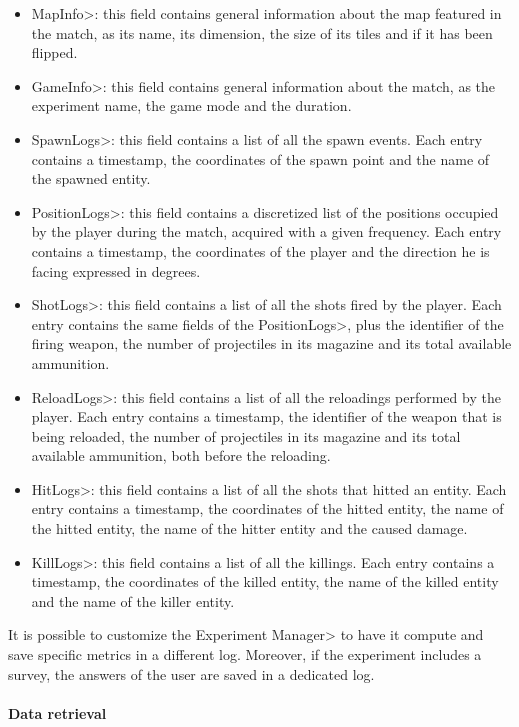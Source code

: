 \begin{itemize}
\item \<MapInfo>: this field contains general information about the map featured in the match, as its name, its dimension, the size of its tiles and if it has been flipped.
\item \<GameInfo>: this field contains general information about the match, as the experiment name, the game mode and the duration.
\item \<SpawnLogs>: this field contains a list of all the spawn events. Each entry contains a timestamp, the coordinates of the spawn point and the name of the spawned entity.
\item \<PositionLogs>: this field contains a discretized list of the positions occupied by the player during the match, acquired with a given frequency. Each entry contains a timestamp, the coordinates of the player and the direction he is facing expressed in degrees.
\item \<ShotLogs>: this field contains a list of all the shots fired by the player. Each entry contains the same fields of the \<PositionLogs>, plus the identifier of the firing weapon, the number of projectiles in its magazine and its total available ammunition.
\item \<ReloadLogs>: this field contains a list of all the reloadings performed by the player. Each entry contains a timestamp, the identifier of the weapon that is being reloaded, the number of projectiles in its magazine and its total available ammunition, both before the reloading.
\item \<HitLogs>: this field contains a list of all the shots that hitted an entity. Each entry contains a timestamp, the coordinates of the hitted entity, the name of the hitted entity, the name of the hitter entity and the caused damage.
\item \<KillLogs>: this field contains a list of all the killings. Each entry contains a timestamp, the coordinates of the killed entity, the name of the killed entity and the name of the killer entity.
\end{itemize}

It is possible to customize the \<Experiment Manager> to have it compute and save specific metrics in a different log. Moreover, if the experiment includes a survey, the answers of the user are saved in a dedicated log.

\paragraph{Data retrieval}

